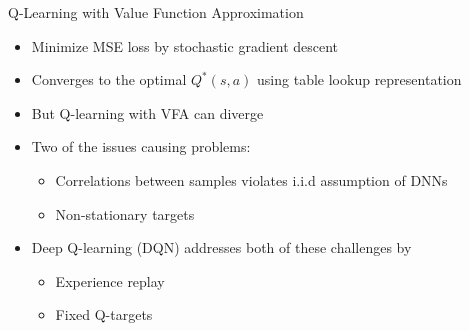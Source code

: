 \documentclass[aspectratio=169]{../latex_main/tntbeamer}  %
\begin{document}
\begin{frame}[c]{Q-Learning with Value Function Approximation}
	
	\begin{itemize}
		\item Minimize MSE loss by stochastic gradient descent
		\item Converges to the optimal $Q^*(s,a)$ using \alert{table lookup} representation
		\item But Q-learning with VFA can diverge
		\item Two of the issues causing problems:
		\begin{itemize}
			\item Correlations between samples violates i.i.d assumption of DNNs
			\item Non-stationary targets
		\end{itemize}
		\item Deep Q-learning (DQN) addresses both of these challenges by
		\begin{itemize}
			\item Experience replay
			\item Fixed Q-targets
		\end{itemize}
	\end{itemize}
	
\end{frame}
\end{document}
